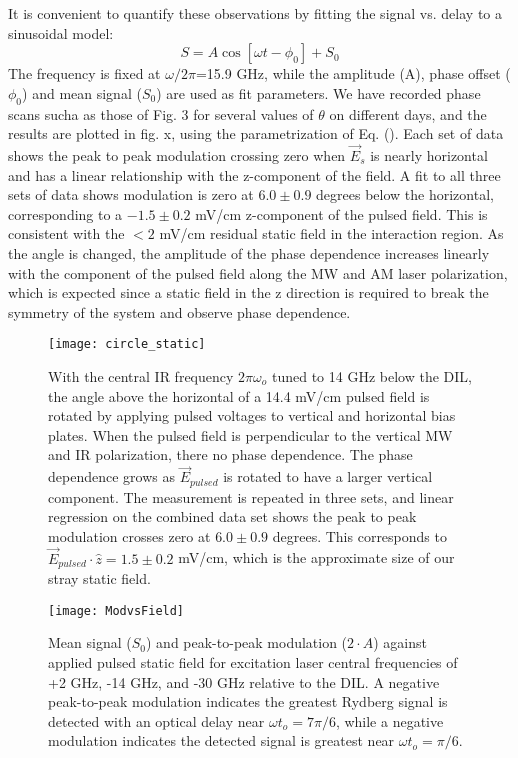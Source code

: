\documentclass[aps,pra,preprint,groupedaddress]{revtex4-1}
\begin{document}
It is convenient to quantify these observations by fitting the signal vs. delay to a sinusoidal model:
\begin{equation} \label{eq:modfit}
S = A \cos{[\omega t - \phi_0]} + S_0
\end{equation}
The frequency is fixed at $\omega/2\pi$=15.9 GHz, while the amplitude (A), phase offset ($\phi_0$) and mean signal ($S_0$) are used as fit parameters. We have recorded phase scans sucha as those of Fig. 3 for several values of $\theta$ on different days, and the results are plotted in fig. x, using the parametrization of Eq. (). Each set of data shows the peak to peak modulation crossing zero when $\vec{E}_s$ is nearly horizontal and has a linear relationship with the z-component of the field. A fit to all three sets of data shows modulation is zero at $6.0 \pm 0.9$ degrees below the horizontal, corresponding to a $-1.5 \pm 0.2$ mV/cm z-component of the pulsed field. This is consistent with the $<2$ mV/cm residual static field in the interaction region. As the angle is changed, the amplitude of the phase dependence increases linearly with the component of the pulsed field along the MW and AM laser polarization, which is expected since a static field in the z direction is required to break the symmetry of the system and observe phase dependence.

\begin{figure}
	\texttt{[image: circle\_static]}
	\caption{With the central IR frequency $2\pi\omega_o$ tuned to 14 GHz below the DIL, the angle above the horizontal of a 14.4 mV/cm pulsed field is rotated by applying pulsed voltages to vertical and horizontal bias plates. When the pulsed field is perpendicular to the vertical MW and IR polarization, there no phase dependence. The phase dependence grows as $\vec{E}_{pulsed}$ is rotated to have a larger vertical component. The measurement is repeated in three sets, and linear regression on the combined data set shows the peak to peak modulation crosses zero at $6.0 \pm 0.9$ degrees. This corresponds to $\vec{E}_{pulsed} \cdot \hat{z} = 1.5 \pm 0.2$ mV/cm, which is the approximate size of our stray static field.}
	\label{fig:CircleStatic}
\end{figure}



\begin{figure}
	\texttt{[image: ModvsField]}
	\caption{Mean signal ($S_0$) and peak-to-peak modulation ($2\cdot A$) against applied pulsed static field for excitation laser central frequencies of +2 GHz, -14 GHz, and -30 GHz relative to the DIL. A negative peak-to-peak modulation indicates the greatest Rydberg signal is detected with an optical delay near $\omega t_o = 7\pi/6$, while a negative modulation indicates the detected signal is greatest near $\omega t_o = \pi/6$.}
	\label{fig:ModvsField}
\end{figure}
\end{document}
